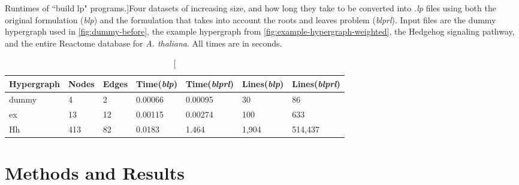 \documentclass[12pt,twoside]{reedthesis}
\theoremstyle{definition}
\begin{document}
\begin{table}[!h]
\begin{center}
  \label{tab:build_lp_runtimes}
  \caption[Runtimes of ``build lp" programs.]{Four datasets of increasing size, and how long they take to be converted into \textit{.lp} files using both the original formulation (\textit{blp}) and the formulation that takes into account the roots and leaves problem (\textit{blprl}). Input files are the dummy hypergraph used in \ref{fig:dummy-before}, the example hypergraph from \ref{fig:example-hypergraph-weighted}, the Hedgehog signaling pathway, and the entire Reactome database for \textit{A. thaliana}. All times are in seconds.}
\begin{tabular}{ |l||l|l|l|l|l|l| }%
  \hline%
  Hypergraph & Nodes & Edges & Time(\textit{blp}) & Time(\textit{blprl}) & Lines(\textit{blp}) & Lines(\textit{blprl}) \\%
  \hline \hline
  dummy & 4 & 2 & 0.00066 & 0.00095 & 30 & 86 \\ \hline%
  ex & 13 & 12 & 0.00115 & 0.00274 & 100 & 633 \\ \hline%
  Hh & 413 & 82 & 0.0183 & 1.464 & 1,904 & 514,437  \\ \hline%
\end{tabular}%
\end{center}
\end{table}


\chapter{Methods and Results}
\end{document}
